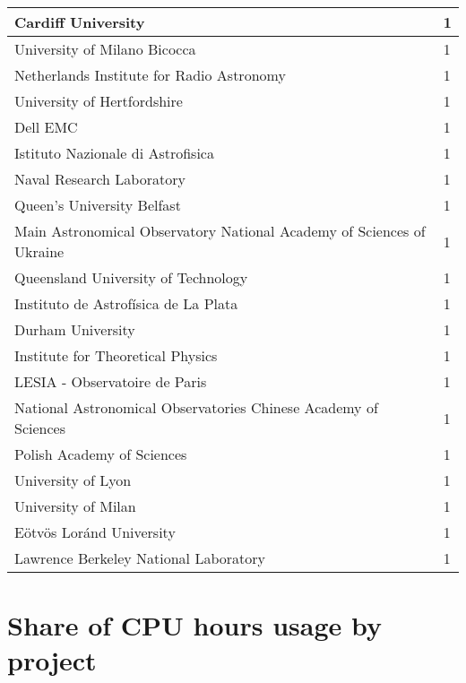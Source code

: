 \documentclass{article}%
\begin{document}
\begin{longtabu}{X[l] X[r]}
\hline%
Cardiff University&1\\%
\hline%
University of Milano Bicocca&1\\%
\hline%
Netherlands Institute for Radio Astronomy&1\\%
\hline%
University of Hertfordshire&1\\%
\hline%
Dell EMC&1\\%
\hline%
Istituto Nazionale di Astrofisica&1\\%
\hline%
Naval Research Laboratory&1\\%
\hline%
Queen's University Belfast&1\\%
\hline%
Main Astronomical Observatory National Academy of Sciences of Ukraine&1\\%
\hline%
Queensland University of Technology&1\\%
\hline%
Instituto de Astrofísica de La Plata&1\\%
\hline%
Durham University&1\\%
\hline%
Institute for Theoretical Physics&1\\%
\hline%
LESIA {-} Observatoire de Paris&1\\%
\hline%
National Astronomical Observatories Chinese Academy of Sciences&1\\%
\hline%
Polish Academy of Sciences&1\\%
\hline%
University of Lyon&1\\%
\hline%
University of Milan&1\\%
\hline%
Eötvös Loránd University&1\\%
\hline%
Lawrence Berkeley National Laboratory&1\\%
\hline%
\end{longtabu}%
\section{Share of CPU hours usage by project}%
\end{document}
